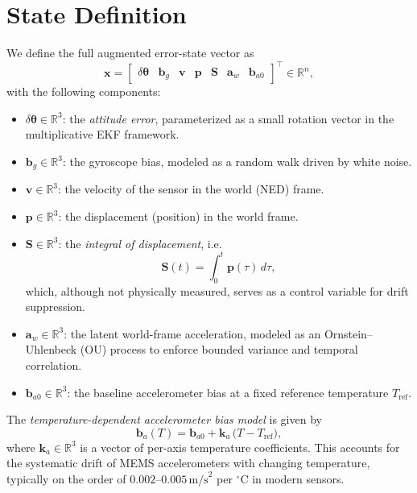 \documentclass[11pt]{article}
\begin{document}
\section{State Definition}

We define the full augmented error-state vector as
\begin{equation}
\bm{x} =
\begin{bmatrix}
\delta\bm\theta & \bm b_g & \bm v & \bm p & \bm S & \bm a_w & \bm b_{a0}
\end{bmatrix}^\top \in \mathbb{R}^n,
\label{eq:state_vector}
\end{equation}
with the following components:
\begin{itemize}
\item $\delta\bm\theta \in \mathbb{R}^3$: the \emph{attitude error}, parameterized as a small rotation vector in the multiplicative EKF framework.
\item $\bm b_g \in \mathbb{R}^3$: the gyroscope bias, modeled as a random walk driven by white noise.
\item $\bm v \in \mathbb{R}^3$: the velocity of the sensor in the world (NED) frame.
\item $\bm p \in \mathbb{R}^3$: the displacement (position) in the world frame.
\item $\bm S \in \mathbb{R}^3$: the \emph{integral of displacement}, i.e.
  \[
  \bm S(t) = \int_0^t \bm p(\tau)\, d\tau,
  \]
  which, although not physically measured, serves as a control variable for drift suppression.
\item $\bm a_w \in \mathbb{R}^3$: the latent world-frame acceleration, modeled as an Ornstein--Uhlenbeck (OU) process to enforce bounded variance and temporal correlation.
\item $\bm b_{a0} \in \mathbb{R}^3$: the baseline accelerometer bias at a fixed reference temperature $T_\text{ref}$.
\end{itemize}

The \emph{temperature-dependent accelerometer bias model} is given by
\begin{equation}
\bm b_a(T) = \bm b_{a0} + \bm k_a \,\big(T - T_\text{ref}\big),
\label{eq:accel_bias_temp}
\end{equation}
where $\bm k_a \in \mathbb{R}^3$ is a vector of per-axis temperature coefficients. 
This accounts for the systematic drift of MEMS accelerometers with changing temperature, 
typically on the order of $0.002$--$0.005 \,\text{m/s}^2$ per ${}^\circ$C in modern sensors.
\end{document}
